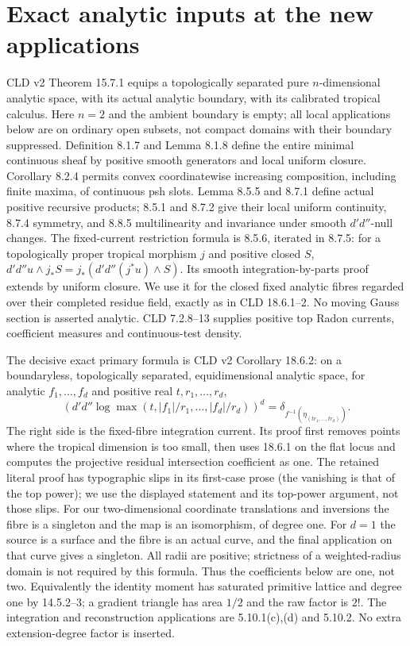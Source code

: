 \documentclass[11pt]{article}
\newcommand{\DD}{d'd''}
\begin{document}
\section{Exact analytic inputs at the new applications}
CLD v2 Theorem 15.7.1 equips a topologically separated pure $n$-dimensional
analytic space, with its actual analytic boundary, with its calibrated
tropical calculus. Here $n=2$ and the ambient boundary is empty; all local
applications below are on ordinary open subsets, not compact domains with
their boundary suppressed. Definition 8.1.7 and Lemma 8.1.8 define the
entire minimal continuous sheaf by positive smooth generators and local
uniform closure. Corollary 8.2.4 permits convex coordinatewise increasing
composition, including finite maxima, of continuous psh slots.
Lemma 8.5.5 and 8.7.1 define actual positive recursive products;
8.5.1 and 8.7.2 give their local uniform continuity, 8.7.4 symmetry,
and 8.8.5 multilinearity and invariance under smooth $\DD$-null changes.
The fixed-current restriction formula is 8.5.6, iterated in 8.7.5:
for a topologically proper tropical morphism $j$ and positive closed $S$,
$\DD u\wedge j_*S=j_*(\DD(j^*u)\wedge S)$.
Its smooth integration-by-parts proof extends by uniform closure.
We use it for the closed fixed analytic fibres regarded over their
completed residue field, exactly as in CLD 18.6.1--2. No moving Gauss
section is asserted analytic. CLD 7.2.8--13 supplies positive top Radon
currents, coefficient measures and continuous-test density.

The decisive exact primary formula is CLD v2 Corollary 18.6.2:
on a boundaryless, topologically separated, equidimensional analytic
space, for analytic $f_1,\ldots,f_d$ and positive real
$t,r_1,\ldots,r_d$,
\[
 (\DD\log\max(t,|f_1|/r_1,\ldots,|f_d|/r_d))^d
 =\delta_{f^{-1}(\eta_{(tr_1,\ldots,tr_d)})}.
\]
The right side is the fixed-fibre integration current. Its proof first
removes points where the tropical dimension is too small, then uses
18.6.1 on the flat locus and computes the projective residual intersection
coefficient as one. The retained literal proof has typographic slips in
its first-case prose (the vanishing is that of the top power); we use
the displayed statement and its top-power argument, not those slips.
For our two-dimensional coordinate translations and inversions the fibre
is a singleton and the map is an isomorphism, of degree one. For $d=1$
the source is a surface and the fibre is an actual curve, and the final
application on that curve gives a singleton. All radii are positive;
strictness of a weighted-radius domain is not required by this formula.
Thus the coefficients below are one, not two. Equivalently the
identity moment has saturated primitive lattice and degree one by
14.5.2--3; a gradient triangle has area $1/2$ and the raw factor is $2!$.
The integration and reconstruction applications are 5.10.1(c),(d)
and 5.10.2. No extra extension-degree factor is inserted.
\end{document}
